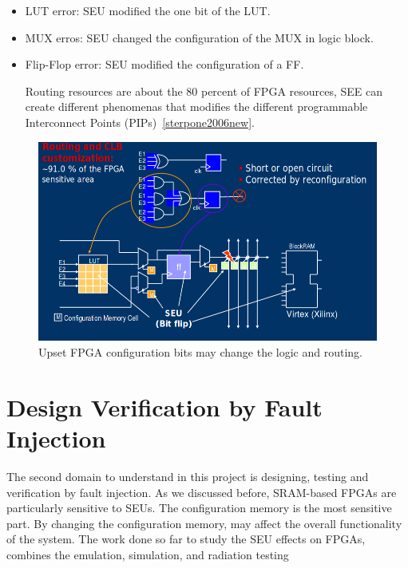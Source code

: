 \begin{itemize}
\item LUT error: SEU modified the one bit of the LUT.

\item MUX erros: SEU changed the configuration of the MUX in logic block.

\item Flip-Flop error: SEU modified the configuration of a FF.

Routing resources are about the 80 percent of FPGA resources, SEE can create different phenomenas that modifies the different programmable Interconnect Points (PIPs)~\ref{sterpone2006new}.

\end{itemize}



\begin{figure}
 \centering
  \captionsetup{justification=centering}    
   \includegraphics[scale=0.4]{figures/img/seu.png}
   \caption{Upset FPGA configuration bits may change the logic and routing.}
\label{fig:seu}
\end{figure}






\section{Design Verification by Fault Injection}




The second domain to understand in this project is designing, testing and verification by fault injection. As we discussed before, SRAM-based FPGAs are particularly sensitive to SEUs. The configuration memory is the most sensitive part. By changing the configuration memory, may affect the overall functionality of the system. The work done so far to study the SEU effects on FPGAs, combines the emulation, simulation, and radiation testing

